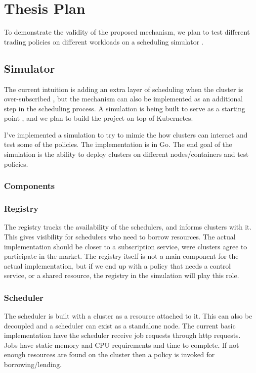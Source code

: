 \section{Thesis Plan}

To demonstrate the validity of the proposed mechanism, we plan to test different trading policies 
on different workloads on a scheduling simulator \cite{sched-github}.

\subsection{Simulator}
The current intuition is adding an extra layer 
of scheduling when the cluster is over-subscribed \cite{zaharia_delay_2010}, 
but the mechanism can also be implemented as an additional step in the scheduling process. 
A simulation is being built to serve as a starting point \cite{sched-github}, 
and we plan to build the project on top of Kubernetes.

I've implemented a simulation to try to mimic the how clusters can interact and test some of the policies. 
The implementation is in Go. The end goal of the simulation is the ability to deploy clusters on different 
nodes/containers and test policies.

\subsubsection{Components}
\subsubsection{Registry}
The registry tracks the availability of the schedulers, and informs clusters with it. 
This gives visibility for schedulers who need to borrow resources. 
The actual implementation should be closer to a subscription service, 
were clusters agree to participate in the market. The registry itself is not a main 
component for the actual implementation, but if we end up with a policy that needs a control service, 
or a shared resource, the registry in the simulation will play this role.

\subsubsection{Scheduler}
The scheduler is built with a cluster as a resource attached to it. 
This can also be decoupled and a scheduler can exist as a standalone node. 
The current basic implementation have the scheduler receive job requests through http requests. 
Jobs have static memory and CPU requirements and time to complete. If not enough resources 
are found on the cluster then a policy is invoked for borrowing/lending.


